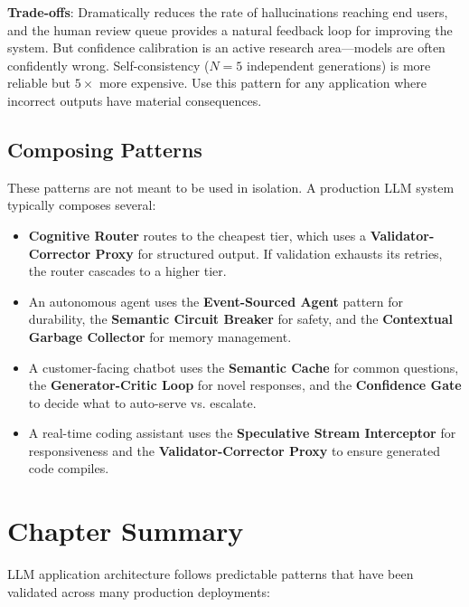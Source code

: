 \textbf{Trade-offs}: Dramatically reduces the rate of hallucinations reaching end users, and the human review queue provides a natural feedback loop for improving the system. But confidence calibration is an active research area---models are often confidently wrong. Self-consistency ($N = 5$ independent generations) is more reliable but $5\times$ more expensive. Use this pattern for any application where incorrect outputs have material consequences.


\subsection{Composing Patterns}

These patterns are not meant to be used in isolation. A production LLM system typically composes several:

\begin{itemize}[leftmargin=*]
    \item \textbf{Cognitive Router} routes to the cheapest tier, which uses a \textbf{Validator-Corrector Proxy} for structured output. If validation exhausts its retries, the router cascades to a higher tier.
    \item An autonomous agent uses the \textbf{Event-Sourced Agent} pattern for durability, the \textbf{Semantic Circuit Breaker} for safety, and the \textbf{Contextual Garbage Collector} for memory management.
    \item A customer-facing chatbot uses the \textbf{Semantic Cache} for common questions, the \textbf{Generator-Critic Loop} for novel responses, and the \textbf{Confidence Gate} to decide what to auto-serve vs. escalate.
    \item A real-time coding assistant uses the \textbf{Speculative Stream Interceptor} for responsiveness and the \textbf{Validator-Corrector Proxy} to ensure generated code compiles.
\end{itemize}


\section{Chapter Summary}

LLM application architecture follows predictable patterns that have been validated across many production deployments:

